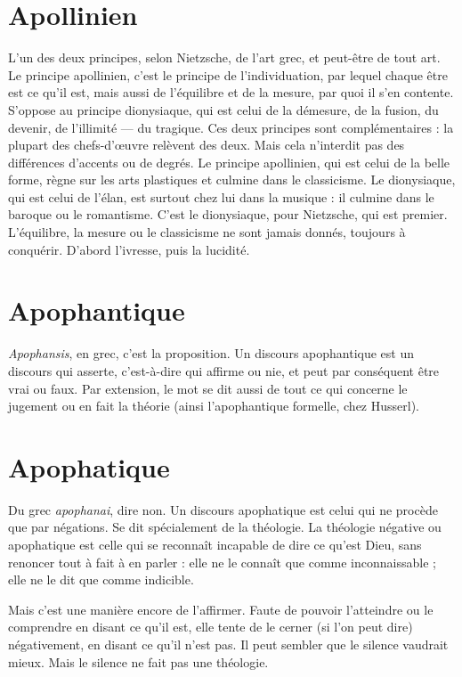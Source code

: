 \section{Apollinien}
L’un des deux principes, selon Nietzsche, de l’art grec, et peut-être
de tout art. Le principe apollinien, c’est le principe de
l'individuation, par lequel chaque être est ce qu’il est, mais aussi de l'équilibre
et de la mesure, par quoi il s’en contente. S’oppose au principe dionysiaque,
qui est celui de la démesure, de la fusion, du devenir, de l’illimité — du tragique.
Ces deux principes sont complémentaires : la plupart des chefs-d’œuvre relèvent
des deux. Mais cela n’interdit pas des différences d’accents ou de degrés.
Le principe apollinien, qui est celui de la belle forme, règne sur les arts plastiques
et culmine dans le classicisme. Le dionysiaque, qui est celui de l’élan, est
surtout chez lui dans la musique : il culmine dans le baroque ou le romantisme.
C’est le dionysiaque, pour Nietzsche, qui est premier. L'équilibre, la
mesure ou le classicisme ne sont jamais donnés, toujours à conquérir. D’abord
l'ivresse, puis la lucidité.

\section{Apophantique}
{\it Apophansis}, en grec, c’est la proposition. Un discours
apophantique est un discours qui asserte, c’est-à-dire qui
affirme ou nie, et peut par conséquent être vrai ou faux. Par extension, le mot
se dit aussi de tout ce qui concerne le jugement ou en fait la théorie (ainsi l’apophantique
formelle, chez Husserl).

\section{Apophatique}
Du grec {\it apophanai}, dire non. Un discours apophatique
est celui qui ne procède que par négations. Se dit spécialement
de la théologie. La théologie négative ou apophatique est celle qui se
reconnaît incapable de dire ce qu’est Dieu, sans renoncer tout à fait à en parler :
elle ne le connaît que comme inconnaissable ; elle ne le dit que comme indicible.

Mais c’est une manière encore de l’affirmer. Faute de pouvoir l’atteindre
ou le comprendre en disant ce qu’il est, elle tente de le cerner (si l’on peut dire)
négativement, en disant ce qu’il n’est pas. Il peut sembler que le silence vaudrait
mieux. Mais le silence ne fait pas une théologie.

